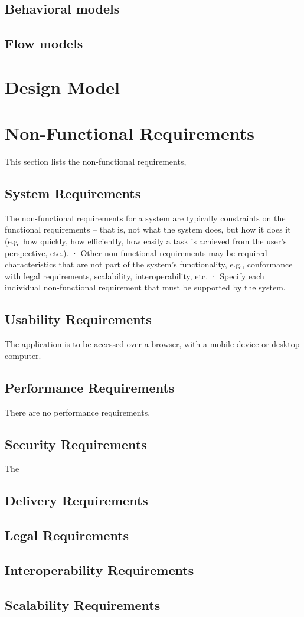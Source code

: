 \subsection{Behavioral models}

\subsection{Flow models}

\section{Design Model}


\section{Non-Functional Requirements}

This section lists the non-functional requirements, 

\subsection{System Requirements}

The non-functional requirements for a system are typically constraints on the functional requirements – that is, not what the system does, but how it does it (e.g. how quickly, how efficiently, how easily a task is achieved from the user’s perspective, etc.).
· Other non-functional requirements may be required characteristics that are not part of the system’s functionality, e.g., conformance with legal requirements, scalability, interoperability, etc.
· Specify each individual non-functional requirement that must be supported by the system.

\subsection{Usability Requirements}

The application is to be accessed over a browser, with a mobile device or desktop computer.

\subsection{Performance Requirements}

There are no performance requirements.

\subsection{Security Requirements}

The 

\subsection{Delivery Requirements}
\subsection{Legal Requirements}
\subsection{Interoperability Requirements}
\subsection{Scalability Requirements}